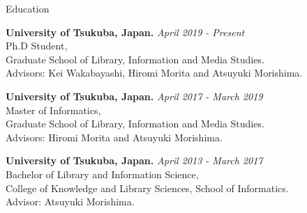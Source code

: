 \documentclass{resume} %
\begin{document}

\begin{rSection}{Education}

{\bf University of Tsukuba, Japan. } \hfill {\em April 2019 - Present}
\\ Ph.D Student,
\\ Graduate School of Library, Information and Media Studies.
\\ Advisors: Kei Wakabayashi, Hiromi Morita and Atsuyuki Morishima.

{\bf University of Tsukuba, Japan. } \hfill {\em April 2017 - March 2019}
\\ Master of Informatics,
\\ Graduate School of Library, Information and Media Studies.
\\ Advisors: Hiromi Morita and Atsuyuki Morishima.

{\bf University of Tsukuba, Japan. } \hfill {\em April 2013 - March 2017} 
\\ Bachelor of Library and Information Science,
\\ College of Knowledge and Library Sciences, School of Informatics.
\\ Advisor: Atsuyuki Morishima.
\end{rSection}
\end{document}
